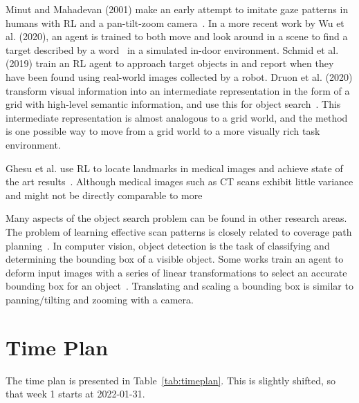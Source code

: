 \documentclass{article}
\begin{document}
Minut and Mahadevan (2001) make an early attempt to imitate gaze patterns in humans with RL and a pan-tilt-zoom camera~\cite{minut2001}. In a more recent work by Wu et al. (2020), an agent is trained to both move and look around in a scene to find a target described by a word~\cite{wu2020} in a simulated in-door environment. Schmid et al. (2019) train an RL agent to approach target objects in and report when they have been found using real-world images collected by a robot. Druon et al. (2020) transform visual information into an intermediate representation in the form of a grid with high-level semantic information, and use this for object search~\cite{druon2020}. This intermediate representation is almost analogous to a grid world, and the method is one possible way to move from a grid world to a more visually rich task environment. 

Ghesu et al. use RL to locate landmarks in medical images and achieve state of the art results~\cite{ghesu2016,ghesu2019}. Although medical images such as CT scans exhibit little variance and might not be directly comparable to more 

Many aspects of the object search problem can be found in other research areas. The problem of learning effective scan patterns is closely related to coverage path planning~\cite{galceran2013}. In computer vision, object detection is the task of classifying and determining the bounding box of a visible object. Some works train an agent to deform input images with a series of linear transformations to select an accurate bounding box for an object~\cite{caicedo2015,jie2017}. Translating and scaling a bounding box is similar to panning/tilting and zooming with a camera. 

\section{Time Plan}

The time plan is presented in Table~\ref{tab:timeplan}. This is slightly shifted, so that week 1 starts at 2022-01-31.
\end{document}
